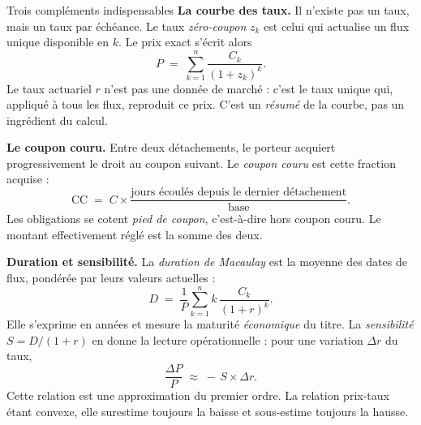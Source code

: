 \begin{generalisation}{Trois compléments indispensables}
\textbf{La courbe des taux.} Il n'existe pas un taux, mais un taux par échéance.
Le taux \emph{zéro-coupon} $z_k$ est celui qui actualise
un flux unique disponible en $k$. Le prix exact s'écrit alors
\[
  P \;=\; \sum_{k=1}^{n} \frac{C_k}{(1+z_k)^{k}} .
\]
Le taux actuariel $r$ n'est pas une donnée de marché : c'est le taux unique qui,
appliqué à tous les flux, reproduit ce prix. C'est un \emph{résumé} de la courbe,
pas un ingrédient du calcul.

\medskip
\textbf{Le coupon couru.} Entre deux détachements, le porteur acquiert
progressivement le droit au coupon suivant. Le \emph{coupon
couru} est cette fraction acquise :
\[
  \mathrm{CC} \;=\; C \times \frac{\text{jours écoulés depuis le dernier détachement}}{\text{base}} .
\]
Les obligations se cotent \emph{pied de coupon}, c'est-à-dire hors coupon couru.
Le montant effectivement réglé est la somme des deux.

\medskip
\textbf{Duration et sensibilité.} La \emph{duration de
Macaulay} est la moyenne des dates de flux, pondérée par leurs
valeurs actuelles :
\[
  D \;=\; \frac{1}{P}\sum_{k=1}^{n} k \,\frac{C_k}{(1+r)^{k}} .
\]
Elle s'exprime en années et mesure la maturité \emph{économique} du titre. La
\emph{sensibilité} $S = D/(1+r)$ en donne la lecture
opérationnelle : pour une variation $\Delta r$ du taux,
\[
  \frac{\Delta P}{P} \;\approx\; -\,S \times \Delta r .
\]
Cette relation est une approximation du premier ordre. La relation prix-taux
étant convexe, elle surestime toujours la baisse et sous-estime toujours la
hausse.
\end{generalisation}

\begin{center}
\end{center}

